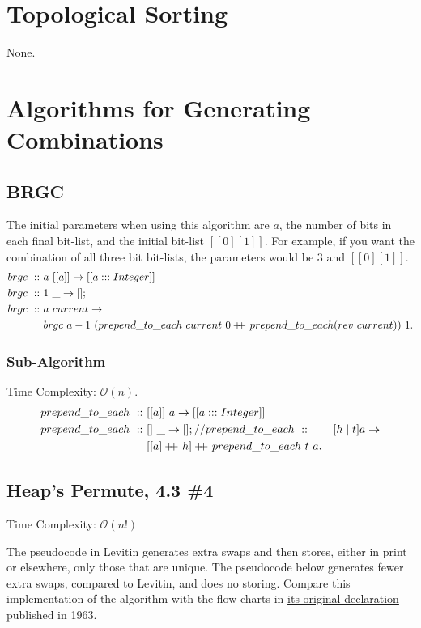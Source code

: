 \documentclass[a4paper,10pt]{book}
\newcommand\doubleplus{+\kern-1.3ex+\kern0.8ex}
\begin{document}
\section{Topological Sorting}

None.

\section{Algorithms for Generating Combinations}

\subsection{BRGC}

The initial parameters when using this algorithm are $a$, the number of bits in each final bit-list, and the initial bit-list $[[0] [1]]$. For example, if you want the combination of all three bit bit-lists, the parameters would be $3$ and $[[0] [1]]$.
\begin{align*}
brgc\ ::\ &a\ [[a]]\rightarrow [[a:::Integer]]\\
brgc\ ::\ &1\ \_\rightarrow [];\\
brgc\ ::\ &a\ current\rightarrow\\
	&brgc\ a-1\ (prepend\_to\_each\ current\ 0\doubleplus prepend\_to\_each (rev\ current))\ 1.
\end{align*}

\subsubsection{Sub-Algorithm}
Time Complexity: $\mathcal{O}(n)$.
\begin{align*}
prepend\_to\_each\ ::\ &[[a]]\ a\rightarrow [[a:::Integer]]\\
prepend\_to\_each\ ::\ &[]\ \_\rightarrow [];//
prepend\_to\_each\ ::\ &[h\mid t] a\rightarrow\\
	&[[a]\doubleplus h]\doubleplus prepend\_to\_each\ t\ a.
\end{align*}

\subsection{Heap's Permute, 4.3 \#4}Time Complexity: $\mathcal{O}(n!)$

The pseudocode in Levitin generates extra swaps and then stores, either in print or elsewhere, only those that are unique. The pseudocode below generates fewer extra swaps, compared to Levitin, and does no storing. Compare this implementation of the algorithm with the flow charts in \href{https://academic.oup.com/comjnl/article/6/3/293/360213?login=false}{its original declaration} published in 1963.
\end{document}
